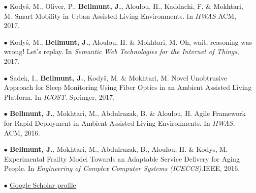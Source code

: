 \documentclass[paper=a4,fontsize=11pt]{temp} %
\begin{document}
   \begin{minipage}{0.88\linewidth}
$\bullet$ Kodyš, M., Oliver, P., \textbf{\textcolor{subheadings}{Bellmunt, J.}}, Aloulou, H., Kaddachi, F. \& Mokhtari, M. Smart Mobility in Urban Assisted Living Environments. In \textit{IIWAS} 
ACM, 2017.

$\bullet$ Kodyš, M., \textbf{\textcolor{subheadings}{Bellmunt, J.}}, Aloulou, H. \& Mokhtari, M. Oh, wait, reasoning was wrong! Let's replay. In \textit{Semantic Web Technologies for the Internet of Things}, 2017.



  

$\bullet$ Sadek, I., \textbf{\textcolor{subheadings}{Bellmunt, J.}}, Kodyš, M. \& Mokhtari, M. Novel Unobtrusive Approach for Sleep Monitoring Using Fiber Optics in an Ambient Assisted Living Platform. In \textit{ICOST}. Springer, 2017.
 

$\bullet$ \textbf{\textcolor{subheadings}{Bellmunt, J.}}, Mokhtari, M., Abdulrazak, B. \& Aloulou, H.  Agile Framework for Rapid Deployment in Ambient Assisted Living Environments. In \textit{IIWAS}. ACM, 2016.



$\bullet$ \textbf{\textcolor{subheadings}{Bellmunt, J.}}, Mokhtari, M., Abdulrazak, B., Aloulou, H. \& Kodys, M. Experimental Frailty Model Towards an Adaptable Service Delivery for Aging People. In \textit{Engineering of Complex Computer Systems (ICECCS)}.IEEE, 2016.


$\bullet$ 
{\href{https://scholar.google.com/citations?user=5UV3gPkAAAAJ&hl=ca}{\color{subheadings}Google Scholar profile}}

 \end{minipage} 
\end{document}
